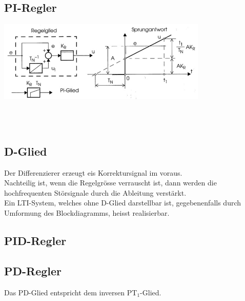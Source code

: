 	\subsection{PI-Regler }
		\begin{minipage}{15cm}
        \includegraphics[angle={0},width=10cm]{./bilder/PI_Regler.jpg}
        \end{minipage}\\ \\
		\begin{minipage}{15cm}
        \qquad
        \end{minipage}
		
	
	\subsection{D-Glied }
		Der Differenzierer erzeugt eis Korrektursignal im voraus.\\
		Nachteilig ist, wenn die Regelgrösse verrauscht ist, dann werden die
		hochfrequenten Störsignale durch die Ableitung verstärkt.\\
		Ein LTI-System, welches ohne D-Glied darstellbar ist, gegebenenfalls durch
		Umformung des Blockdiagramms, heisst realisierbar.
	
	
	\subsection{PID-Regler  }
	
	\subsection{PD-Regler  }
	 \qquad
	Das PD-Glied entspricht dem inversen PT$_1$-Glied.
	
